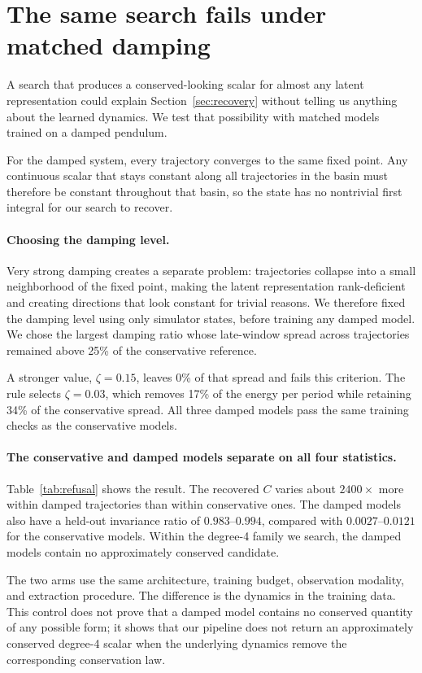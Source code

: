 \section{The same search fails under matched damping}
\label{sec:refusal}

A search that produces a conserved-looking scalar for almost any latent representation could explain
Section~\ref{sec:recovery} without telling us anything about the learned dynamics. We test that
possibility with matched models trained on a damped pendulum.

For the damped system, every trajectory converges to the same fixed point. Any continuous scalar
that stays constant along all trajectories in the basin must therefore be constant throughout that
basin, so the state has no nontrivial first integral for our search to recover.

\paragraph{Choosing the damping level.} Very strong damping creates a separate problem: trajectories
collapse into a small neighborhood of the fixed point, making the latent representation
rank-deficient and creating directions that look constant for trivial reasons. We therefore fixed
the damping level using only simulator states, before training any damped model. We chose the
largest damping ratio whose late-window spread across trajectories remained above 25\% of the
conservative reference.

A stronger value, $\zeta=0.15$, leaves 0\% of that spread and fails this criterion. The rule selects
$\zeta=0.03$, which removes 17\% of the energy per period while retaining 34\% of the conservative
spread. All three damped models pass the same training checks as the conservative models.

\paragraph{The conservative and damped models separate on all four statistics.}
Table~\ref{tab:refusal} shows the result. The recovered $C$ varies about $2400\times$ more within
damped trajectories than within conservative ones. The damped models also have a held-out invariance
ratio of $0.983$--$0.994$, compared with $0.0027$--$0.0121$ for the conservative models. Within the
degree-4 family we search, the damped models contain no approximately conserved candidate.

The two arms use the same architecture, training budget, observation modality, and extraction
procedure. The difference is the dynamics in the training data. This control does not prove that a
damped model contains no conserved quantity of any possible form; it shows that our pipeline does
not return an approximately conserved degree-4 scalar when the underlying dynamics remove the
corresponding conservation law.
